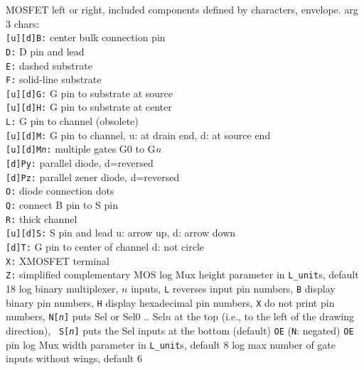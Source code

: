   {MOSFET left or right, included components defined by characters,
  envelope.
   arg 3 chars:\\
   {\tt [u][d]B:} center bulk connection pin\\
   {\tt D:} D pin and lead\\
   {\tt E:} dashed substrate\\
   {\tt F:} solid-line substrate\\
   {\tt [u][d]G:} G pin to substrate at source\\
   {\tt [u][d]H:} G pin to substrate at center\\
   {\tt L:} G pin to channel (obsolete)\\
   {\tt [u][d]M:} G pin to channel, u: at drain end, d: at source end\\
   {\tt [u][d]M{\sl n}:} multiple gates G0 to G{\sl n}\\
   {\tt [d]Py:} parallel diode, d=reversed\\
   {\tt [d]Pz:} parallel zener diode, d=reversed\\
   {\tt O:} diode connection dots\\
   {\tt Q:} connect B pin to S pin\\
   {\tt R:} thick channel\\
   {\tt [u][d]S:} S pin and lead u: arrow up, d: arrow down\\
   {\tt [d]T:} G pin to center of channel d: not circle\\
   {\tt X:} XMOSFET terminal\\
   {\tt Z:} simplified complementary MOS
   }%
%
  {log}%
  {Mux height parameter in {\tt L\_unit}s, default 18}%
%
  {log}%
  {binary multiplexer, $n$ inputs,
    {\tt L} reverses input pin numbers, {\tt B} display binary pin
    numbers, {\tt H} display hexadecimal pin numbers, {\tt X} do not
    print pin numbers, {\tt N[{\sl n}]} puts Sel or Sel$0$ .. Sel$n$
    at the top (i.e., to the left of the drawing direction), {\tt
    S[{\sl n}]} puts the Sel inputs at the bottom (default) {\tt OE}
    ({\tt N}: negated) {\tt OE} pin }%
%
  {log}%
  {Mux width parameter in {\tt L\_unit}s, default 8}%
%
  {log}%
  {max number of gate inputs without wings, default 6}%

%

